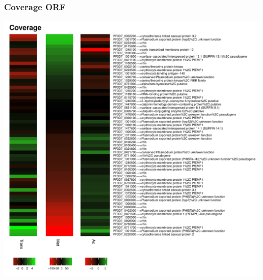 \documentclass{article}\usepackage[]{graphicx}\usepackage[]{color}
\newenvironment{knitrout}{}{} %
\begin{document}
\subsubsection{Coverage ORF}
\begin{knitrout}
\color{fgcolor}

{\centering \includegraphics[width=.9\linewidth]{figure/minimal-met_cov_ORF-1} 

}



\end{knitrout}
\clearpage
\end{document}
